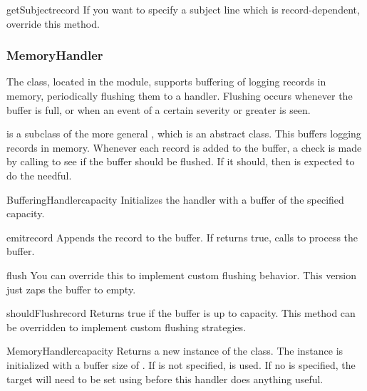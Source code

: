 \begin{methoddesc}{getSubject}{record}
If you want to specify a subject line which is record-dependent,
override this method.
\end{methoddesc}

\subsubsection{MemoryHandler}

The  class, located in the
 module, supports buffering of logging
records in memory, periodically flushing them to a 
handler. Flushing occurs whenever the buffer is full, or when an event
of a certain severity or greater is seen.

 is a subclass of the more general
, which is an abstract class. This buffers logging
records in memory. Whenever each record is added to the buffer, a
check is made by calling  to see if the buffer
should be flushed.  If it should, then  is expected to
do the needful.

\begin{classdesc}{BufferingHandler}{capacity}
Initializes the handler with a buffer of the specified capacity.
\end{classdesc}

\begin{methoddesc}{emit}{record}
Appends the record to the buffer. If  returns true,
calls  to process the buffer.
\end{methoddesc}

\begin{methoddesc}{flush}{}
You can override this to implement custom flushing behavior. This version
just zaps the buffer to empty.
\end{methoddesc}

\begin{methoddesc}{shouldFlush}{record}
Returns true if the buffer is up to capacity. This method can be
overridden to implement custom flushing strategies.
\end{methoddesc}

\begin{classdesc}{MemoryHandler}{capacity}
Returns a new instance of the  class. The
instance is initialized with a buffer size of . If
 is not specified,  is used. If no
 is specified, the target will need to be set using
 before this handler does anything useful.
\end{classdesc}

